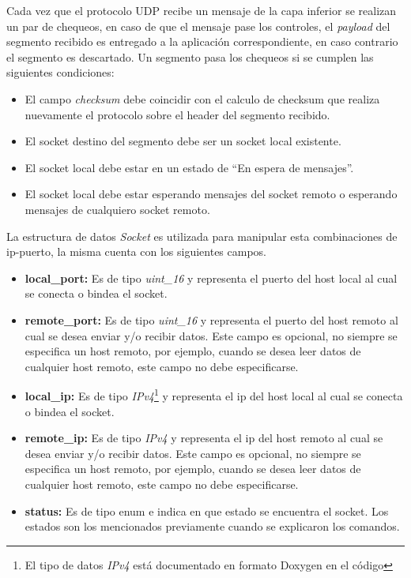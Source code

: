 \documentclass[10pt,a4paper]{article}
\begin{document}
Cada vez que el protocolo UDP recibe un mensaje de la capa inferior se realizan un par de chequeos, en caso de que el mensaje pase los controles, el \textit{payload} del segmento recibido es entregado a la aplicación correspondiente, en caso contrario el segmento es descartado. Un segmento pasa los chequeos si se cumplen las siguientes condiciones:

\begin{itemize}
\item El campo \textit{checksum} debe coincidir con el calculo de checksum que realiza nuevamente el protocolo sobre el header del segmento recibido.
\item El socket destino del segmento debe ser un socket local existente.
\item El socket local debe estar en un estado de ``En espera de mensajes''.
\item El socket local debe estar esperando mensajes del socket remoto o esperando mensajes de cualquiero socket remoto.
\end{itemize}

La estructura de datos \textit{Socket} es utilizada para manipular esta combinaciones de ip-puerto, la misma cuenta con los siguientes campos.

\begin{itemize}
\item \textbf{local\_port: } Es de tipo \textit{uint\_16} y representa el puerto del host local al cual se conecta o bindea el socket.
\item \textbf{remote\_port: } Es de tipo \textit{uint\_16} y representa el puerto del host remoto al cual se desea enviar y/o recibir datos. Este campo es opcional, no siempre se especifica un host remoto, por ejemplo, cuando se desea leer datos de cualquier host remoto, este campo no debe especificarse.
\item \textbf{local\_ip: } Es de tipo \textit{IPv4}\footnote{El tipo de datos \textit{IPv4} está documentado en formato Doxygen en el código} y representa el ip del host local al cual se conecta o bindea el socket.
\item \textbf{remote\_ip: } Es de tipo \textit{IPv4} y representa el ip del host remoto al cual se desea enviar y/o recibir datos. Este campo es opcional, no siempre se especifica un host remoto, por ejemplo, cuando se desea leer datos de cualquier host remoto, este campo no debe especificarse.
\item \textbf{status: } Es de tipo enum e indica en que estado se encuentra el socket. Los estados son los mencionados previamente cuando se explicaron los comandos.
\end{itemize}
\end{document}
